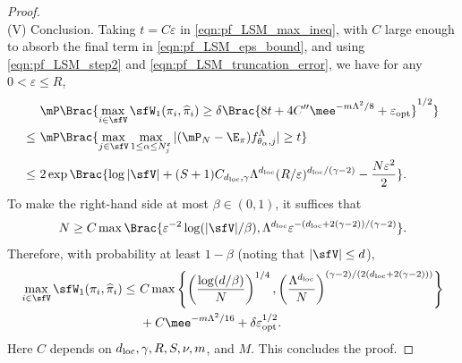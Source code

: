 \documentclass[11pt]{article}
\begin{document}
\begin{proof}
\ \\[-5pt]
\noindent
(V) Conclusion.
%
Taking $t=C\varepsilon$ in \eqref{eqn:pf_LSM_max_ineq}, with $C$ large enough to absorb the final term in \eqref{eqn:pf_LSM_eps_bound}, and using \eqref{eqn:pf_LSM_step2} and \eqref{eqn:pf_LSM_truncation_error}, we have for any $0<\varepsilon\le R$,
\begin{align*}
    &\mP \Brac{ \max_{i \in \sfV} \sfW_1(\pi_i,\widehat{\pi}_i) \ge \delta\Brac{8t+4C''\mee^{-m\Lambda^2/8}+\varepsilon_{\rm opt}}^{1/2} } \\
    \le~& \mP \Brac{ \max_{j\in \sfV} \max_{1\le \alpha\le N_j^\varepsilon} | (\mP_N - \E_\pi) f_{\theta_\alpha,j}^\Lambda | \ge t } \\
    \le~& 2\exp \Brac{ \log |\sfV| + (S+1) C_{d_{\rm loc},\gamma}\Lambda^{d_{\rm loc}} (R/\varepsilon)^{d_{\rm loc}/(\gamma-2)} - \frac{N \varepsilon^2}{2} }.
\end{align*}
To make the right-hand side at most $\beta \in (0,1)$, it suffices that
\[
    N \ge C\max \Brac{ \varepsilon^{-2} \log (|\sfV|/\beta) ,
    \Lambda^{d_{\rm loc}}\varepsilon^{ - (d_{\rm loc}+2(\gamma-2))/(\gamma-2) } }.
\]
Therefore, with probability at least $1-\beta$ (noting that $|\sfV| \le d$),
\begin{align*}
    \max_{i \in \sfV} \sfW_1(\pi_i,\widehat{\pi}_i)
    \le~& C \max \left\{ \left(\frac{\log(d/\beta)}{N}\right)^{1/4}, \left(\frac{\Lambda^{d_{\rm loc}}}{N}\right)^{(\gamma-2)/(2(d_{\rm loc} + 2(\gamma-2)))} \right\} \\
    &+ C\mee^{-m\Lambda^2/16} + \delta\varepsilon_{\rm opt}^{1/2}.
\end{align*}
Here $C$ depends on $d_{\rm loc},\gamma,R,S,\nu,m$, and $M$. This concludes the proof.
\end{proof}




\end{document}
